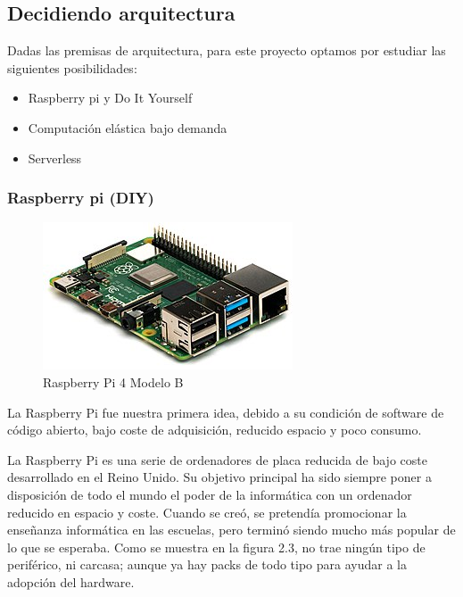 \subsection{Decidiendo arquitectura}
Dadas las premisas de arquitectura, para este proyecto optamos por estudiar las siguientes posibilidades:
\begin{itemize}
    \item Raspberry pi y Do It Yourself
    \item Computación elástica bajo demanda
    \item Serverless
\end{itemize}
\subsubsection{Raspberry pi (DIY)}
\begin{figure}[h]
\centering
\includegraphics[scale=0.5]{archivos/RPi_4.jpg}
\caption{Raspberry Pi 4 Modelo B}
\label{fig:rpi4}
\end{figure}
\vspace{1em}
\par La Raspberry Pi fue nuestra primera idea, debido a su condición de software de código abierto, bajo coste de adquisición, reducido espacio y poco consumo.
\vspace{1em}
\par La Raspberry Pi es una serie de ordenadores de placa reducida de bajo coste desarrollado en el Reino Unido. Su objetivo principal ha sido siempre poner a disposición de todo el mundo el poder de la informática con un ordenador reducido en espacio y coste. Cuando se creó, se pretendía promocionar la enseñanza informática en las escuelas, pero terminó siendo mucho más popular de lo que se esperaba. Como se muestra en la figura 2.3, no trae ningún tipo de periférico, ni carcasa; aunque ya hay packs de todo tipo para ayudar a la adopción del hardware.
